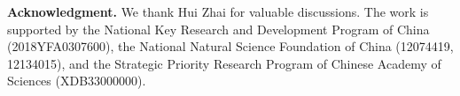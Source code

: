 \documentclass[reprint,aps,prl,twocolumn,superscriptaddress]{revtex4-1}
\begin{document}



\acknowledgments
{\bf Acknowledgment.} We thank Hui Zhai for valuable discussions.
The work is supported by the National Key Research and Development Program of China (2018YFA0307600), the National Natural Science Foundation of China (12074419, 12134015), and the Strategic Priority Research Program of Chinese Academy of Sciences (XDB33000000).
\end{document}
